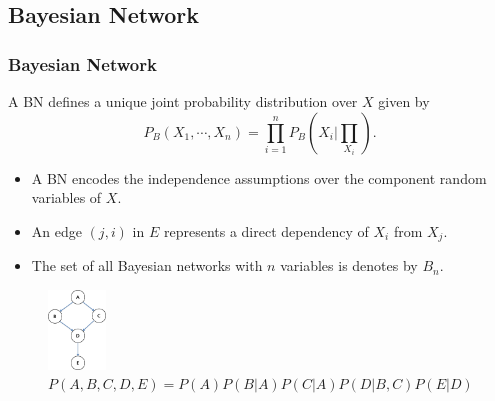 \documentclass{beamer}
\begin{document}
\subsection{Bayesian Network}
\begin{frame}
\frametitle{Bayesian Network}
{\scriptsize{}
A BN defines a unique joint probability distribution over $X$ given by
$$P_{B}(X_{1},\cdots,X_{n})=\prod_{i=1}^{n}P_{B}(X_{i}|\prod_{X_{i}}).$$

\begin{itemize}
	\item A BN encodes the independence assumptions over the component random variables of $X$.
	
	\item An edge $(j, i)$ in $E$ represents a direct dependency of $X_{i}$ from $X_{j}$.
	
	\item The set of all Bayesian networks with $n$ variables is denotes by $B_{n}$.
\end{itemize}

\begin{figure}[!h]
	\centering
		\includegraphics[height=60pt]{images/image01}
		\caption{{\scriptsize{}$P(A,B,C,D,E)=P(A)P(B|A)P(C|A)P(D|B,C)P(E|D)$}}
\end{figure}	
}
\end{frame}
\end{document}

